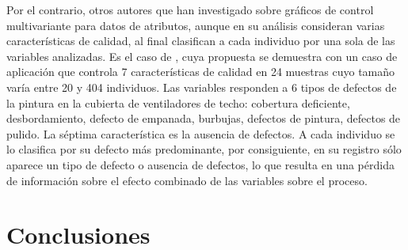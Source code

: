 \documentclass[water,article,submit,moreauthors,pdftex]{mdpi}
\begin{document}
Por el contrario, otros autores que han investigado sobre gráficos de
control multivariante para datos de atributos, aunque en su análisis
consideran varias características de calidad, al final clasifican a cada
individuo por una sola de las variables analizadas. Es el caso de
\citet{ranjan2008multivariate}, cuya propuesta se demuestra con un caso
de aplicación que controla 7 características de calidad en 24 muestras
cuyo tamaño varía entre 20 y 404 individuos. Las variables responden a 6
tipos de defectos de la pintura en la cubierta de ventiladores de techo:
cobertura deficiente, desbordamiento, defecto de empanada, burbujas,
defectos de pintura, defectos de pulido. La séptima característica es la
ausencia de defectos. A cada individuo se lo clasifica por su defecto
más predominante, por consiguiente, en su registro sólo aparece un tipo
de defecto o ausencia de defectos, lo que resulta en una pérdida de
información sobre el efecto combinado de las variables sobre el proceso.

\hypertarget{conclusiones}{%
\section{Conclusiones}\label{conclusiones}}
\end{document}
